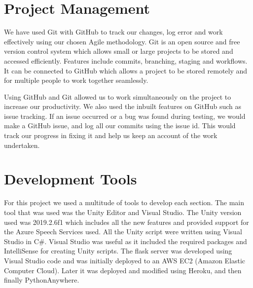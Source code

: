\section{Project Management}
We have used Git with GitHub to track our changes, log error and work effectively using our chosen Agile methodology. Git is an open source and free version control system which allows small or large projects to be stored and accessed efficiently. Features include commits, branching, staging and workflows. It can be connected to GitHub which allows a project to be stored remotely and for multiple people to work together seamlessly. 

\par
\medskip

Using GitHub and Git allowed us to work simultaneously on the project to increase our productivity. We also used the inbuilt features on GitHub such as issue tracking. If an issue occurred or a bug was found during testing, we would make a GitHub issue, and log all our commits using the issue id. This would track our progress in fixing it and help us keep an account of the work undertaken.

\section{Development Tools}
For this project we used a multitude of tools to develop each section. The main tool that was used was the Unity Editor and Visual Studio. The Unity version used was 2019.2.6f1 which includes all the new features and provided support for the Azure Speech Services used. All the Unity script were written using Visual Studio in C\#. Visual Studio was useful as it included the required packages and IntelliSense for creating Unity scripts. The flask server was developed using Visual Studio code and was initially deployed to an AWS EC2 (Amazon Elastic Computer Cloud). Later it was deployed and modified using Heroku, and then finally PythonAnywhere.
